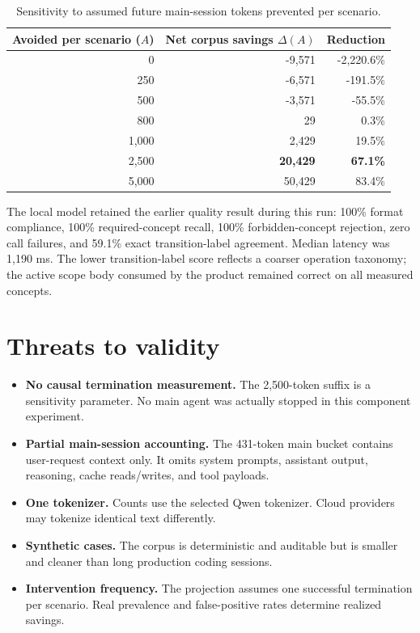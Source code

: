 \documentclass[10pt]{article}
\newcommand{\result}[1]{\textcolor{scopeblue}{\textbf{#1}}}
\begin{document}
\begin{table}[ht]
\centering
\caption{Sensitivity to assumed future main-session tokens prevented per scenario.}
\label{tab:sensitivity}
\begin{tabular}{rrr}
\toprule
Avoided per scenario ($A$) & Net corpus savings $\Delta(A)$ & Reduction \\
\midrule
0 & -9,571 & -2,220.6\% \\
250 & -6,571 & -191.5\% \\
500 & -3,571 & -55.5\% \\
800 & 29 & 0.3\% \\
1,000 & 2,429 & 19.5\% \\
2,500 & \result{20,429} & \result{67.1\%} \\
5,000 & 50,429 & 83.4\% \\
\bottomrule
\end{tabular}
\end{table}

The local model retained the earlier quality result during this run: 100\%
format compliance, 100\% required-concept recall, 100\% forbidden-concept
rejection, zero call failures, and 59.1\% exact transition-label agreement.
Median latency was 1,190 ms. The lower transition-label score reflects a
coarser operation taxonomy; the active scope body consumed by the product
remained correct on all measured concepts.

\section{Threats to validity}

\begin{itemize}
  \item \textbf{No causal termination measurement.} The 2,500-token suffix is a
  sensitivity parameter. No main agent was actually stopped in this component
  experiment.
  \item \textbf{Partial main-session accounting.} The 431-token main bucket
  contains user-request context only. It omits system prompts, assistant output,
  reasoning, cache reads/writes, and tool payloads.
  \item \textbf{One tokenizer.} Counts use the selected Qwen tokenizer. Cloud
  providers may tokenize identical text differently.
  \item \textbf{Synthetic cases.} The corpus is deterministic and auditable but
  is smaller and cleaner than long production coding sessions.
  \item \textbf{Intervention frequency.} The projection assumes one successful
  termination per scenario. Real prevalence and false-positive rates determine
  realized savings.
\end{itemize}
\end{document}
